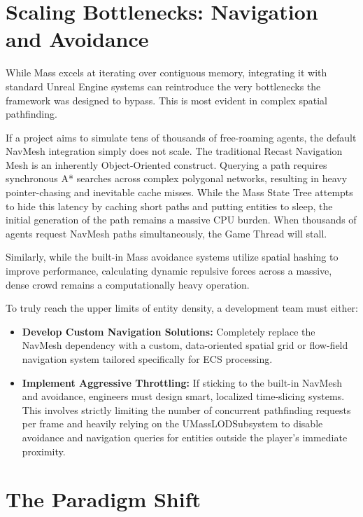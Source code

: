 \section{Scaling Bottlenecks: Navigation and Avoidance}

While Mass excels at iterating over contiguous memory, integrating it with standard Unreal Engine systems can reintroduce the very bottlenecks the framework was designed to bypass. This is most evident in complex spatial pathfinding.

If a project aims to simulate tens of thousands of free-roaming agents, the default NavMesh integration simply does not scale. The traditional Recast Navigation Mesh is an inherently Object-Oriented construct. Querying a path requires synchronous A* searches across complex polygonal networks, resulting in heavy pointer-chasing and inevitable cache misses. While the Mass State Tree attempts to hide this latency by caching short paths and putting entities to sleep, the initial generation of the path remains a massive CPU burden. When thousands of agents request NavMesh paths simultaneously, the Game Thread will stall.

Similarly, while the built-in Mass avoidance systems utilize spatial hashing to improve performance, calculating dynamic repulsive forces across a massive, dense crowd remains a computationally heavy operation.

To truly reach the upper limits of entity density, a development team must either:

\begin{itemize}
    \item \textbf{Develop Custom Navigation Solutions:} Completely replace the NavMesh dependency with a custom, data-oriented spatial grid or flow-field navigation system tailored specifically for ECS processing.
    \item \textbf{Implement Aggressive Throttling:} If sticking to the built-in NavMesh and avoidance, engineers must design smart, localized time-slicing systems. This involves strictly limiting the number of concurrent pathfinding requests per frame and heavily relying on the UMassLODSubsystem to disable avoidance and navigation queries for entities outside the player's immediate proximity.
\end{itemize}

\section{The Paradigm Shift}

